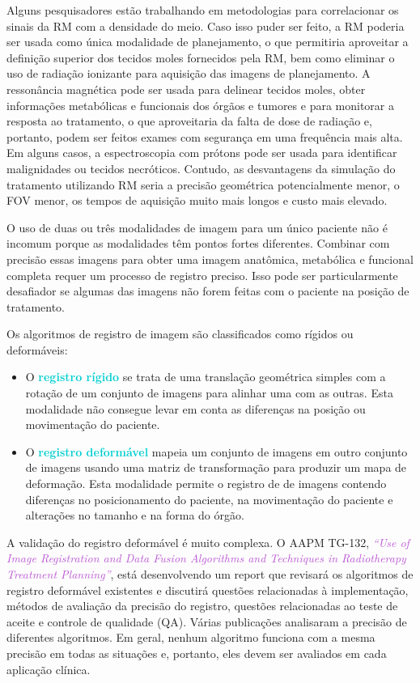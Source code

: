 \documentclass[11pt,a4paper]{article}
\begin{document}
	Alguns pesquisadores estão trabalhando em metodologias para correlacionar os sinais da RM com a densidade do meio. Caso isso puder ser feito, a RM poderia ser usada como única modalidade de planejamento, o que permitiria aproveitar a definição superior dos tecidos moles fornecidos pela RM, bem como eliminar o uso de radiação ionizante para aquisição das imagens de planejamento. A ressonância magnética pode ser usada para delinear tecidos moles, obter informações metabólicas e funcionais dos órgãos e tumores e para monitorar a resposta ao tratamento, o que aproveitaria da falta de dose de radiação e, portanto, podem ser feitos exames com segurança em uma frequência mais alta. Em alguns casos, a espectroscopia com prótons pode ser usada para identificar malignidades ou tecidos necróticos. Contudo, as desvantagens da simulação do tratamento utilizando RM seria a precisão geométrica potencialmente menor, o FOV menor, os tempos de aquisição muito mais longos e custo mais elevado.

	O uso de duas ou três modalidades de imagem para um único paciente não é incomum porque as modalidades têm pontos fortes diferentes. Combinar com precisão essas imagens para obter uma imagem anatômica, metabólica e funcional completa requer um processo de registro preciso. Isso pode ser particularmente desafiador se algumas das imagens não forem feitas com o paciente na posição de tratamento.
	
	Os algoritmos de registro de imagem são classificados como rígidos ou deformáveis:

	\begin{itemize}
		\item O \textcolor{DarkTurquoise}{\textbf{registro rígido}} se trata de uma translação geométrica simples com a rotação de um conjunto de imagens para alinhar uma com as outras. Esta modalidade não consegue levar em conta as diferenças na posição ou movimentação do paciente.
		
		\item O \textcolor{DarkTurquoise}{\textbf{registro deformável}} mapeia um conjunto de imagens em outro conjunto de imagens usando uma matriz de transformação para produzir um mapa de deformação. Esta modalidade permite o registro de de imagens contendo diferenças no posicionamento do paciente, na movimentação do paciente e alterações no tamanho e na forma do órgão.
	\end{itemize}

	A validação do registro deformável é muito complexa. O AAPM TG-132, \textcolor{MediumOrchid}{\textit{``Use of Image Registration and Data Fusion Algorithms and Techniques in Radiotherapy Treatment Planning''}}, está desenvolvendo um report que revisará os algoritmos de registro deformável existentes e discutirá questões relacionadas à implementação, métodos de avaliação da precisão do registro, questões relacionadas ao teste de aceite e controle de qualidade (QA). Várias publicações analisaram a precisão de diferentes algoritmos. Em geral, nenhum algoritmo funciona com a mesma precisão em todas as situações e, portanto, eles devem ser avaliados em cada aplicação clínica.
\end{document}

